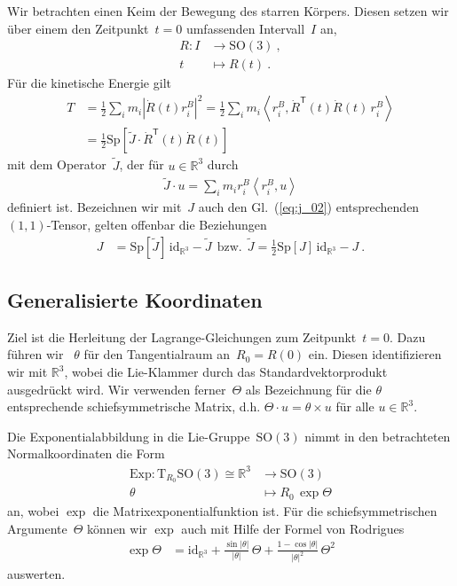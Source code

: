 \documentclass[10pt,a4paper]{article}
\newcommand{\mydef}[1]{\textls{#1}}
\newcommand{\trans}{^\mathsf{T}}
\begin{document}
Wir betrachten einen Keim der Bewegung des starren Körpers.
Diesen setzen wir über einem den Zeitpunkt~$t=0$ umfassenden Intervall~$I$ an,
\begin{align}
\label{eq:r_t}
	R: I &\rightarrow \mathrm{SO}(3)
	\ ,\\\nonumber
	t &\mapsto R(t)
	\ .
\end{align}
Für die kinetische Energie gilt
\begin{align}
	T &= 
	\frac{1}{2}\sum_i m_i 
	\left|				
		\dot{R}(t)r_i^B
	\right|^2
	=
	\frac{1}{2}\sum_i m_i 
	\left\langle
		r_i^B, \dot{R}\trans(t)\dot{R}(t)\,r_i^B
	\right\rangle
	\nonumber\\
\label{eq:t_rdot}
	&= \frac{1}{2}
	\mathrm{Sp}\left[
		\tilde{J}
		\cdot
		\dot{R}\trans(t)\dot{R}(t)
	\right]
\end{align}
mit dem Operator~$\tilde{J}$, der für $u\in\mathbb{R}^3$ durch
\begin{align}
	\tilde{J}\cdot u = \sum_i m_i 
	r_i^B
	\left\langle
		r_i^B, u
	\right\rangle		
\end{align}
definiert ist.
Bezeichnen wir mit~$J$ auch den Gl.~(\ref{eq:j_02}) entsprechenden $(1,1)$-Tensor, gelten offenbar die Beziehungen
\begin{align}
	J &= \mathrm{Sp}[\tilde{J}]\,\mathrm{id}_{\mathbb{R}^3} - \tilde{J}
	\ \ \text{bzw.}\ \ 
	\tilde{J} = 
	\frac{1}{2}
	\mathrm{Sp}[J]\,\mathrm{id}_{\mathbb{R}^3}
	- J
	\ .
\end{align}

\subsection{Generalisierte Koordinaten}

Ziel ist die Herleitung der Lagrange-Gleichungen zum Zeitpunkt~$t=0$.
Dazu führen wir \mydef{Normalkoordinaten}~$\theta$ für den Tangentialraum an~$R_0=R(0)$ ein.
Diesen identifizieren wir mit $\mathbb{R}^3$, wobei die Lie-Klammer durch das Standardvektorprodukt ausgedrückt wird.
Wir verwenden ferner~$\Theta$ als Bezeichnung für die $\theta$ entsprechende schiefsymmetrische Matrix, d.h. $\Theta\cdot u=\theta\times u$ für alle $u\in\mathbb{R}^3$.

Die Exponentialabbildung in die Lie-Gruppe~$\mathrm{SO}(3)$ nimmt in den betrachteten Normalkoordinaten die Form
\begin{align}
	\mathrm{Exp}: 
	\mathrm{T}_{R_0}\mathrm{SO}(3)\cong\mathbb{R}^3
	&\rightarrow \mathrm{SO}(3)
	\nonumber\\
	\theta
	&\mapsto
	R_0\,\exp\Theta
\end{align}
an, wobei $\exp$ die Matrixexponentialfunktion ist.
Für die schiefsymmetrischen Argumente~$\Theta$ können wir $\exp$ auch mit Hilfe der Formel von Rodrigues
\begin{align}
\label{eq:rodrigues}
	\exp\Theta
	&= \mathrm{id}_{\mathbb{R}^3} 
	+ \frac{\sin|\theta|}{|\theta|}\,\Theta
	+ \frac{1 - \cos|\theta|}{|\theta|^2}\,\Theta^2
\end{align}
auswerten.
\end{document}

